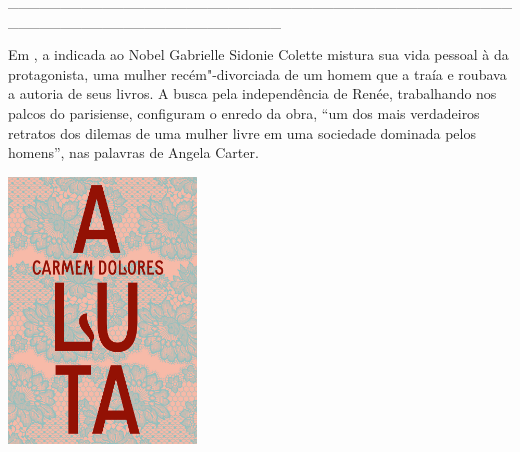 \hspace*{-2cm}\_\_\_\_\_\_\_\_\_\_\_\_\_\_\_\_\_\_\_\_\_\_\_\_\_\_\_\_\_\_\_\_\_\_\_\_\_\_\_\_\_\_\_\_\_\_\_\_\_\_\_\_\_\_\_\_\_\_\_\_\_\_\_\_\_\_\_\_\_\_\_\_\_\_

\medskip

\noindent{}Em {}, a indicada ao Nobel Gabrielle Sidonie Colette mistura sua vida pessoal à da protagonista, uma mulher recém"-divorciada de um homem que a traía e roubava a autoria de seus livros. A busca pela independência de Renée, trabalhando nos palcos do {} parisiense, configuram o enredo da obra, “um dos mais verdadeiros retratos dos dilemas de uma mulher livre em uma sociedade dominada pelos homens”, nas palavras de Angela Carter.

\vfill

\hspace*{-.4cm}\begin{minipage}[c]{0.90\linewidth}
\small{
{}}
\end{minipage}

\pagebreak

\hspace{.5cm}

\begin{center}
\hspace*{-.5cm}\includegraphics[width=50mm]{./imgs/luta.jpg}
\end{center}

